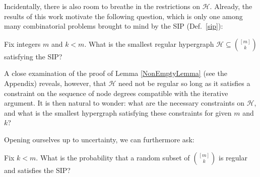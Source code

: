 Incidentally, there is also room to breathe in the restrictions on $\mathcal{H}$. Already, the results of this work motivate the following question, which is only one among many combinatorial problems brought to mind by the SIP (Def.~\ref{sip}):
\begin{question}
Fix integers $m$ and $k < m$. What is the smallest regular hypergraph $\mathcal{H} \subseteq {[m] \choose k}$ satisfying the SIP?
\end{question}

A close examination of the proof of Lemma \ref{NonEmptyLemma} (see the Appendix) reveals, however, that $\mathcal{H}$ need not be regular so long as it satisfies a constraint on the sequence of node degrees compatible with the iterative argument. It is then natural to wonder: what are the necessary constraints on $\mathcal{H}$, and what is the smallest hypergraph satisfying these constraints for given $m$ and $k$?


Opening ourselves up to uncertainty, we can furthermore ask:
\begin{question}\label{probofsip}
Fix $k < m$. What is the probability that a random subset of ${[m] \choose k}$ is regular and satisfies the SIP?
\end{question}

